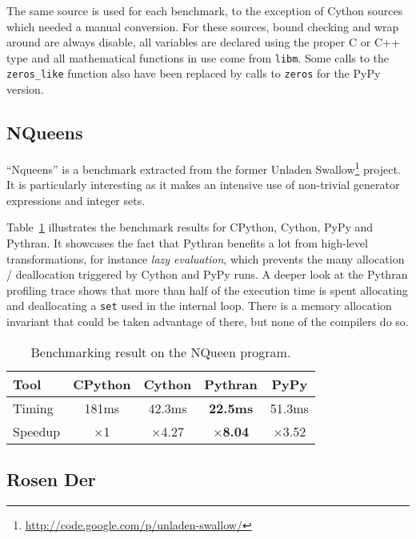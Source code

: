 \documentclass[10pt, onecolumn, preprint]{sigplanconf}
\begin{document}
The same source is used for each benchmark, to the exception of Cython sources
which needed a manual conversion. For these sources, bound checking and wrap
around are always disable, all variables are declared using the proper C or C++
type and all mathematical functions in use come from \texttt{libm}. Some calls
to the \texttt{zeros\_like} function also have been replaced by calls to
\texttt{zeros} for the PyPy version.

\subsection{NQueens}

``Nqueens'' is a benchmark extracted from the former Unladen
Swallow\footnote{\url{http://code.google.com/p/unladen-swallow/}} project. It
is particularly interesting as it makes an intensive use of non-trivial
generator expressions and integer sets.

Table~\ref{tbl:nqueen} illustrates the benchmark results for CPython, Cython,
PyPy and Pythran.  It showcases the fact that Pythran benefits a lot from
high-level transformations, for instance \emph{lazy evaluation}, which prevents
the many allocation / deallocation triggered by Cython and PyPy runs.  A deeper
look at the Pythran profiling trace shows that more than half of the execution
time is spent allocating and deallocating a \texttt{set} used in the internal
loop. There is a memory allocation invariant that could be taken advantage of
there, but none of the compilers do so.

\begin{table}
    \centering

    \begin{tabular}{|l|c|c|c|c|}
        \hline
     Tool    &  CPython    &   Cython     &     Pythran   &  PyPy \\
    \hline
    Timing  &  181ms   &   42.3ms     &    \textbf{22.5ms} &  51.3ms  \\
    \hline
    Speedup &  $\times$1         &    $\times$4.27      &    \textbf{$\times$8.04}   &  $\times$3.52    \\
    \hline
\end{tabular}
\caption{Benchmarking result on the NQueen program.}
\label{tbl:nqueen}

\end{table}

\subsection{Rosen Der}
\end{document}
